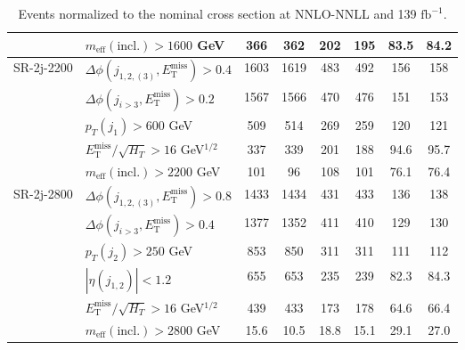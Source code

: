 \documentclass[10pt,fleqn]{article}
\newcommand{\ifb}{$\mathrm{fb}^{-1}$}
\newcommand{\met}{E^\mathrm{miss}_\mathrm{T}}
\newcommand{\meff}{m_\mathrm{eff}}
\begin{document}
\begin{table}[H]
\begin{tabular}{c|l|c|c|c|c|c|c}
             & $\meff(\mathrm{incl.}) > 1600$ GeV              &      366   &    362    &  202       &   195     &      83.5    &   84.2         \\ \midrule           
SR-2j-2200   & $\Delta\phi(j_{1,2,(3)},\met) > 0.4$            &     1603   &   1619    &  483       &   492     &      156     &   158         \\
             & $\Delta\phi(j_{i>3},\met) > 0.2$                &     1567   &   1566    &  470       &   476     &      151     &   153         \\
             & $p_T(j_1) > 600$ GeV                            &      509   &    514    &  269       &   259     &      120     &   121         \\                     
             & $\met/\sqrt{H_T} > 16$ GeV$^{1/2}$              &      337   &    339    &  201       &   188     &      94.6    &   95.7         \\    
             & $\meff(\mathrm{incl.}) > 2200$ GeV              &      101   &    96     &  108       &   101     &      76.1    &   76.4         \\ \midrule                       
SR-2j-2800   & $\Delta\phi(j_{1,2,(3)},\met) > 0.8$            &     1433   &   1434    &  431       &   433     &      136     &   138         \\
             & $\Delta\phi(j_{i>3},\met) > 0.4$                &     1377   &   1352    &  411       &   410     &      129     &   130         \\
             & $p_T(j_2) > 250$ GeV                            &      853   &    850    &  311       &   311     &      111     &   112         \\      
             & $|\eta(j_{1,2})|< 1.2$                          &      655   &    653    &  235       &   239     &      82.3    &   84.3         \\                   
             & $\met/\sqrt{H_T} > 16$ GeV$^{1/2}$              &      439   &    433    &  173       &   178     &      64.6    &   66.4         \\    
             & $\meff(\mathrm{incl.}) > 2800$ GeV              &     15.6   &   10.5    &  18.8      &   15.1    &      29.1    &   27.0         \\  \bottomrule                 
 \end{tabular}
 \caption{Events normalized to the nominal cross section at NNLO-NNLL and 139 \ifb.}
\end{table}  
\end{document}
